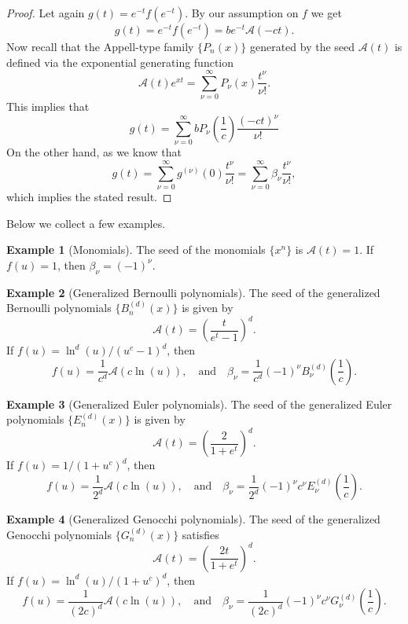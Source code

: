 \documentclass[10pt,reqno,a4paper]{amsart}%
\theoremstyle{definition}
\newtheorem{example}{Example}
\newcommand{\ap}{\ensuremath{\mathcal{A}}}%
\begin{document}
\begin{proof}
Let again $g(t)=e^{-t}f(e^{-t})$. By our assumption on $f$ we get
\[
g(t)=e^{-t}f(e^{-t})=be^{-t}\ap(-ct).
\]
Now recall that the Appell-type family $\{P_{n}(x)\}$ generated by the seed
$\ap(t)$ is defined via the exponential generating function
\[
\ap(t)e^{xt}=\sum_{\nu=0}^{\infty}P_{\nu}(x)\frac{t^{\nu}}{\nu!}.
\]
This implies that
\[
g(t)=\sum_{\nu=0}^{\infty}bP_{\nu}(\frac{1}{c})\frac{(-ct)^{\nu}}{\nu!}%
\]
On the other hand, as we know that
\[
g(t)=\sum_{\nu=0}^{\infty}g^{(\nu)}(0)\frac{t^{\nu}}{\nu!}=\sum_{\nu
=0}^{\infty}\beta_{\nu}\frac{t^{\nu}}{\nu!},
\]
which implies the stated result.
\end{proof}

Below we collect a few examples.

\begin{example}
[Monomials]The seed of the monomials $\{x^{n}\}$ is $\ap(t)=1$. If
$f(u)=1$, then $\beta_{\nu}=(-1)^{\nu}$.
\end{example}

\begin{example}
[Generalized Bernoulli polynomials]The seed of the generalized Bernoulli
polynomials $\{B_{n}^{(d)}(x)\}$ is given by
\[
\ap(t)=\left(  \frac{t}{e^{t}-1}\right)  ^{d}.
\]
If $f(u)=\ln^{d}(u)/(u^{c}-1)^{d}$, then
\[
f(u)=\frac{1}{c^{d}}\ap(c\ln(u)),\quad\text{and}\quad\beta_{\nu}%
=\frac{1}{c^{d}}(-1)^{\nu}B_{\nu}^{(d)}\!\left(  \frac{1}{c}\right)  .
\]

\end{example}

\begin{example}
[Generalized Euler polynomials]The seed of the generalized Euler polynomials
$\{E_{n}^{(d)}(x)\}$ is given by
\[
\ap(t)=\left(  \frac{2}{1+e^{t}}\right)  ^{d}.
\]
If $f(u)=1/(1+u^{c})^{d}$, then
\[
f(u)=\frac{1}{2^{d}}\ap(c\ln(u)),\quad\text{and}\quad\beta_{\nu}%
=\frac{1}{2^{d}}(-1)^{\nu}c^{\nu}E_{\nu}^{(d)}\!\left(  \frac{1}{c}\right)  .
\]

\end{example}

\begin{example}
[Generalized Genocchi polynomials]The seed of the generalized Genocchi
polynomials $\{G_{n}^{(d)}(x)\}$ satisfies
\[
\ap(t)=\left(  \frac{2t}{1+e^{t}}\right)  ^{d}.
\]
If $f(u)=\ln^{d}(u)/(1+u^{c})^{d}$, then
\[
f(u)=\frac{1}{(2c)^{d}}\ap(c\ln(u)),\quad\text{and}\quad\beta_{\nu
}=\frac{1}{(2c)^{d}}(-1)^{\nu}c^{\nu}G_{\nu}^{(d)}\!\left(  \frac{1}%
{c}\right)  .
\]

\end{example}
\end{document}
